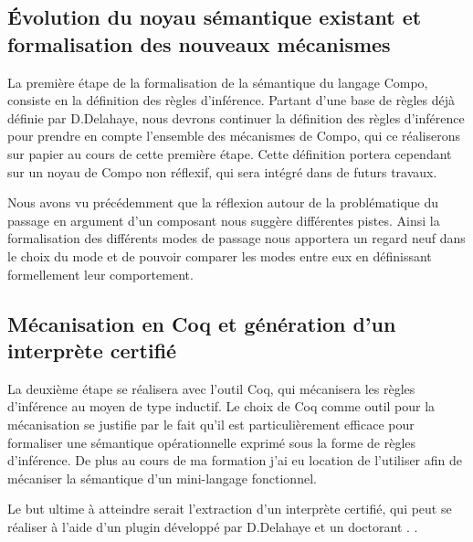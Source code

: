   \subsection{Évolution du noyau sémantique existant et formalisation des nouveaux mécanismes}
  
  La première étape de la formalisation de la sémantique du langage Compo, consiste en la définition des règles d'inférence. Partant d'une base de règles déjà définie par D.Delahaye, nous devrons continuer la définition des règles d'inférence pour prendre en compte l'ensemble des mécanismes de Compo, qui ce réaliserons sur papier au cours de cette première étape. Cette définition portera cependant sur un noyau de Compo non réflexif, qui sera intégré dans de futurs travaux. \\\par
  
  Nous avons vu précédemment que la réflexion autour de la problématique du passage en argument d'un composant nous suggère différentes pistes. Ainsi la formalisation des différents modes de passage nous apportera un regard neuf dans le choix du mode et de pouvoir comparer les modes entre eux en définissant formellement leur comportement.
    
  \subsection{Mécanisation en Coq et génération d’un interprète certifié}
  
  La deuxième étape se réalisera avec l'outil Coq, qui mécanisera les règles d'inférence au moyen de type inductif. Le choix de Coq comme outil pour la mécanisation se justifie par le fait qu'il est particulièrement efficace pour formaliser une sémantique opérationnelle exprimé sous la forme de règles d'inférence. De plus au cours de ma formation j'ai eu location de l'utiliser afin de mécaniser la sémantique d'un mini-langage fonctionnel.
  
  Le but ultime à atteindre serait l'extraction d'un interprète certifié, qui peut se réaliser à l'aide d'un plugin développé par D.Delahaye et un doctorant \cite{Rel-Exec3}.
  .
